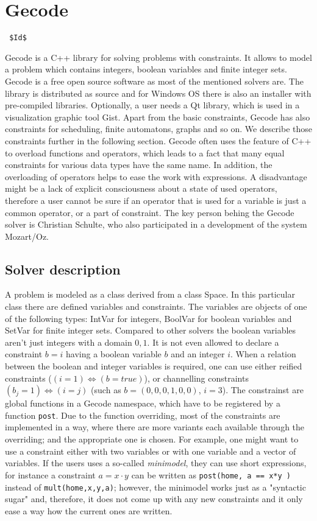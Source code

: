 \section{Gecode}
\verb= $Id$ =

Gecode is a C++ library for solving problems with constraints. It allows to
model a problem which contains integers, boolean variables and finite integer sets. Gecode
is a free open source software as most of the mentioned solvers are. The library is
distributed as source and for Windows OS there is also an installer with
pre-compiled libraries. Optionally, a user needs a Qt library, which is used in 
a visualization graphic tool Gist. Apart from the basic constraints, Gecode has also 
constraints for scheduling, finite automatons, graphs and so on. We describe those
constraints further in the following section. Gecode often uses the feature of C++
to overload functions and operators, which leads to a fact that many equal constraints for
various data types have the same name. In addition, the overloading of operators
helps to ease the work with expressions. A disadvantage might be a lack of explicit consciousness
about a state of used operators, therefore a user cannot be sure if an operator that is used 
for a variable is just a common operator, or a part of constraint. The key person behing the Gecode 
solver is Christian Schulte, who also participated in a development of the system Mozart/Oz. 

\subsection{Solver description}
A problem is modeled as a class derived from a class Space. In this particular class
there are defined variables and constraints. The variables are objects of one of the following types:
IntVar for integers, BoolVar for boolean variables and SetVar for finite integer sets. 
Compared to other solvers the boolean variables aren't just integers with a domain ${0,1}$.
It is not even allowed to declare a constraint $b=i$ having a boolean variable $b$ and an integer $i$.
When a relation between the boolean and integer variables is required, one can use either reified constraints
($(i = 1) \Leftrightarrow (b = true)$), or channelling constraints $(b_j = 1) \Leftrightarrow (i = j)$ (such as $b = (0,0,0,1,0,0)$, $i = 3$).
The constrainst are global functions in a Gecode namespace, which have to be registered by a function \texttt{post}.
Due to the function overriding, most of the constraints are implemented in a way, 
where there are more variants each available through the overriding; and the appropriate one is chosen.
For example, one might want to use a constraint either with two variables or with one variable and 
a vector of variables. If the users uses a so-called {\em minimodel}, they can use short expressions,
for instance a constraint $a = x \cdot y$ can be written as \texttt{post(home, a == x*y )} instead of \texttt{mult(home,x,y,a)}; 
however, the minimodel works just as a "syntactic sugar" and, therefore, it does not come up 
with any new constraints and it only ease a way how the current ones are written. 

